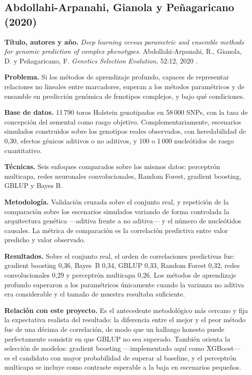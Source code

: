 \documentclass[conference]{IEEEtran}
\begin{document}
\subsection{Abdollahi-Arpanahi, Gianola y Peñagaricano (2020)}

\textbf{Título, autores y año.} \textit{Deep learning versus parametric
and ensemble methods for genomic prediction of complex phenotypes}.
Abdollahi-Arpanahi, R., Gianola, D. y Peñagaricano, F. \textit{Genetics
Selection Evolution}, 52:12, 2020 \cite{abdollahi2020}.

\textbf{Problema.} Si los métodos de aprendizaje profundo, capaces de
representar relaciones no lineales entre marcadores, superan a los
métodos paramétricos y de ensamble en predicción genómica de fenotipos
complejos, y bajo qué condiciones.

\textbf{Base de datos.} 11\,790 toros Holstein genotipados en 58\,000
SNPs, con la tasa de concepción del semental como rasgo objetivo.
Complementariamente, escenarios simulados construidos sobre los genotipos
reales observados, con heredabilidad de 0{,}30, efectos génicos aditivos
o no aditivos, y 100 o 1\,000 nucleótidos de rasgo cuantitativo.

\textbf{Técnicas.} Seis enfoques comparados sobre los mismos datos:
perceptrón multicapa, redes neuronales convolucionales, Random Forest,
gradient boosting, GBLUP y Bayes B.

\textbf{Metodología.} Validación cruzada sobre el conjunto real, y
repetición de la comparación sobre los escenarios simulados variando de
forma controlada la arquitectura genética —aditiva frente a no aditiva—
y el número de nucleótidos causales. La métrica de comparación es la
correlación predictiva entre valor predicho y valor observado.

\textbf{Resultados.} Sobre el conjunto real, el orden de correlaciones
predictivas fue: gradient boosting 0{,}36, Bayes~B 0{,}34, GBLUP 0{,}33,
Random Forest 0{,}32, redes convolucionales 0{,}29 y perceptrón multicapa
0{,}26. Los métodos de aprendizaje profundo superaron a los paramétricos
únicamente cuando la varianza no aditiva era considerable y el tamaño de
muestra resultaba suficiente.

\textbf{Relación con este proyecto.} Es el antecedente metodológico más
cercano y fija la expectativa realista del resultado: la diferencia entre
el mejor y el peor método fue de una décima de correlación, de modo que
un hallazgo honesto puede perfectamente consistir en que GBLUP no sea
superado. También orienta la selección de modelos: gradient boosting
—implementado aquí como XGBoost— es el candidato con mayor probabilidad
de superar al baseline, y el perceptrón multicapa se incluye como
contraste esperable a la baja en escenarios pequeños.
\end{document}
